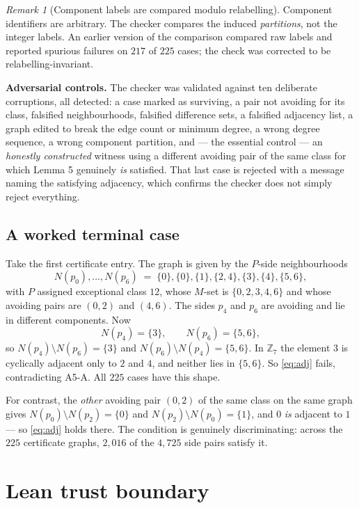 \documentclass[11pt,a4paper]{article}
\theoremstyle{plain}
\theoremstyle{definition}
\theoremstyle{remark}
\newtheorem*{remark}{Remark}
\begin{document}
\begin{remark}[Component labels are compared modulo relabelling]
Component identifiers are arbitrary. The checker compares the induced
\emph{partitions}, not the integer labels. An earlier version of the comparison
compared raw labels and reported spurious failures on $217$ of $225$ cases; the
check was corrected to be relabelling-invariant.
\end{remark}

\textbf{Adversarial controls.} The checker was validated against ten deliberate
corruptions, all detected: a case marked as surviving, a pair not avoiding for
its class, falsified neighbourhoods, falsified difference sets, a falsified
adjacency list, a graph edited to break the edge count or minimum degree, a wrong
degree sequence, a wrong component partition, and --- the essential control --- an
\emph{honestly constructed} witness using a different avoiding pair of the same
class for which Lemma 5 genuinely \emph{is} satisfied. That last case is rejected
with a message naming the satisfying adjacency, which confirms the checker does
not simply reject everything.

\subsection*{A worked terminal case}

Take the first certificate entry. The graph is given by the $P$-side
neighbourhoods
\[
  N(p_0),\dots,N(p_6)
  \;=\;
  \{0\},\{0\},\{1\},\{2,4\},\{3\},\{4\},\{5,6\},
\]
with $P$ assigned exceptional class $12$, whose $M$-set is $\{0,2,3,4,6\}$ and
whose avoiding pairs are $(0,2)$ and $(4,6)$. The sides $p_4$ and $p_6$ are
avoiding and lie in different components. Now
\[
  N(p_4)=\{3\},\qquad N(p_6)=\{5,6\},
\]
so $N(p_4)\setminus N(p_6)=\{3\}$ and $N(p_6)\setminus N(p_4)=\{5,6\}$. In
$\mathbb{Z}_7$ the element $3$ is cyclically adjacent only to $2$ and $4$, and
neither lies in $\{5,6\}$. So \eqref{eq:adj} fails, contradicting \textsf{A5-A}.
All $225$ cases have this shape.

For contrast, the \emph{other} avoiding pair $(0,2)$ of the same class on the same
graph gives $N(p_0)\setminus N(p_2)=\{0\}$ and $N(p_2)\setminus N(p_0)=\{1\}$,
and $0$ \emph{is} adjacent to $1$ --- so \eqref{eq:adj} holds there. The
condition is genuinely discriminating: across the $225$ certificate graphs,
$2{,}016$ of the $4{,}725$ side pairs satisfy it.

\section{Lean trust boundary}\label{sec:lean}
\end{document}
